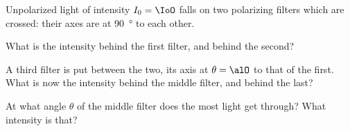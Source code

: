 Unpolarized light of intensity $I_0 = \IoO$ falls on two polarizing filters which are crossed: their axes are at \SI{90}{\degree} to each other.

\begin{abcliste}
\abc What is the intensity behind the first filter, and behind the second?

\abc A third filter is put between the two, its axis at $\theta = \alO$ to that of the first. What is now the intensity behind the middle filter, and behind the last?

\abc At what angle $\theta$ of the middle filter does the most light get through? What intensity is that?
\end{abcliste}
